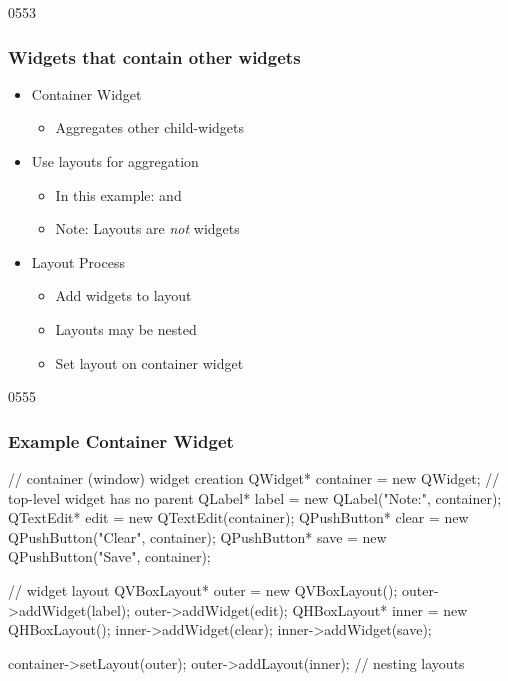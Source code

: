 \begin{slide}{0553}\frametitle{Widgets that contain other widgets}
  
  \begin{itemize}
  \item Container Widget
    \begin{itemize}
    \item Aggregates other child-widgets
    \end{itemize}
  \item Use layouts for aggregation
    \begin{itemize}
    \item In this example:  and \\ 
    \item Note: Layouts are \emph{not} widgets
    \end{itemize}
  \item Layout Process
    \begin{itemize}
    \item Add widgets to layout
    \item Layouts may be nested
    \item Set layout on container widget
    \end{itemize}
  \end{itemize}
\end{slide}

\begin{slide}[fragile]{0555}
  \frametitle{Example Container Widget}
  \begin{cpp}
// container (window) widget creation
QWidget* container = new QWidget; // top-level widget has no parent
QLabel* label = new QLabel("Note:", container);
QTextEdit* edit = new QTextEdit(container);
QPushButton* clear = new QPushButton("Clear", container);
QPushButton* save = new QPushButton("Save", container);
    \end{cpp} 
   \begin{cpp}
// widget layout
QVBoxLayout* outer = new QVBoxLayout();
outer->addWidget(label);
outer->addWidget(edit);
QHBoxLayout* inner = new QHBoxLayout();
inner->addWidget(clear);
inner->addWidget(save);
    \end{cpp} 
  \begin{cpp}
container->setLayout(outer);
outer->addLayout(inner); // nesting layouts
    \end{cpp}
\end{slide}



